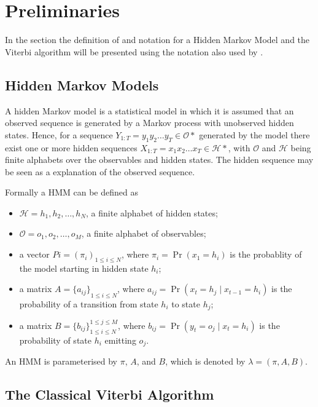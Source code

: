 \documentclass[11pt,twoside,a4,danish,english,report]{memoir}
\begin{document}
\chapter{Preliminaries}
\label{cha:preliminaries}

In the section the definition of and notation for a Hidden Markov Model and the
Viterbi algorithm will be presented using the notation also used by
\citet{sand2013ziphmmlib}.

\section{Hidden Markov Models}
\label{sec:hidden-markov-models}

A hidden Markov model is a statistical model in which it is assumed that an
observed sequence is generated by a Markov process with unobserved hidden
states. Hence, for a sequence $Y_{1:T} = y_1y_2\dots{}y_T \in \mathcal{O*}$
generated by the model there exist one or more hidden sequences
$X_{1:T} = x_1x_2\dots{}x_T \in \mathcal{H*}$, with $\mathcal{O}$ and
$\mathcal{H}$ being finite alphabets over the observables and hidden
states. The hidden sequence may be seen as a explanation of the observed
sequence.

Formally a HMM can be defined as
\begin{itemize}
\item $\mathcal{H} = {h_1, h_2, \dots, h_N}$, a finite alphabet of hidden
  states;
\item $\mathcal{O} = {o_1, o_2, \dots, o_M}$, a finite alphabet of observables;
\item a vector $Pi = {(\pi_i)}_{1 \le i \le N}$, where $\pi_i = \Pr(x_1 =
  h_i)$ is the probablity of the model starting in hidden state $h_i$;
\item a matrix $A = {\{a_{ij}\}}_{1 \le i \le N}$, where $a_{ij} = \Pr(x_t
  = h_j \mid x_{t - 1} = h_i)$ is the probability of a transition from state
  $h_i$ to state $h_j$;
\item a matrix $B = {\{b_{ij}\}}_{1 \le i \le N}^{1 \le j \le M}$, where
  $b_{ij} = \Pr(y_t = o_j \mid x_t = h_i)$ is the probability of state
  $h_i$ emitting $o_j$.
\end{itemize}

An HMM is parameterised by $\pi$, $A$, and $B$, which is denoted by $\lambda =
(\pi, A, B)$.

\section{The Classical Viterbi Algorithm}
\label{sec:class-viterbi-algor}
\end{document}
